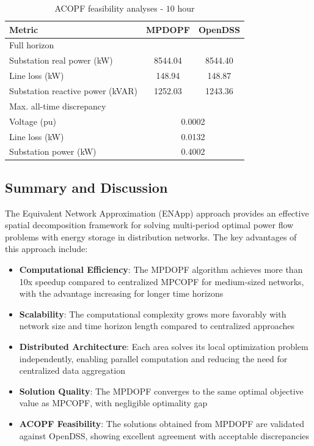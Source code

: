 \begin{table}[t]
    \centering
    \caption{ACOPF feasibility analyses - $10$ hour}
    \begin{tabular}{|l|c|c|}
    \hline
    \textbf{Metric} & \textbf{MPDOPF} & \textbf{OpenDSS} \\ \hline
    Full horizon  & \multicolumn{2}{c|}{} \\ \hline
    \quad Substation real power (kW) & 8544.04 & 8544.40 \\ \hline
    \quad Line loss (kW) & 148.94 & 148.87 \\ \hline
    \quad Substation reactive power (kVAR) & 1252.03 & 1243.36 \\ \hline
    Max. all-time discrepancy & \multicolumn{2}{c|}{} \\ \hline
    \quad Voltage (pu) & \multicolumn{2}{c|}{0.0002} \\ \hline
    \quad Line loss (kW) & \multicolumn{2}{c|}{0.0132} \\ \hline
    \quad Substation power (kW) & \multicolumn{2}{c|}{0.4002} \\ \hline
    \end{tabular}
    \label{table:feas-copf-10-20-30_enapp}
    \vspace{-3mm}
\end{table}

\subsection{Summary and Discussion}

The Equivalent Network Approximation (ENApp) approach provides an effective spatial decomposition framework for solving multi-period optimal power flow problems with energy storage in distribution networks. The key advantages of this approach include:

\begin{itemize}
    \item \textbf{Computational Efficiency}: The MPDOPF algorithm achieves more than 10x speedup compared to centralized MPCOPF for medium-sized networks, with the advantage increasing for longer time horizons
    \item \textbf{Scalability}: The computational complexity grows more favorably with network size and time horizon length compared to centralized approaches
    \item \textbf{Distributed Architecture}: Each area solves its local optimization problem independently, enabling parallel computation and reducing the need for centralized data aggregation
    \item \textbf{Solution Quality}: The MPDOPF converges to the same optimal objective value as MPCOPF, with negligible optimality gap
    \item \textbf{ACOPF Feasibility}: The solutions obtained from MPDOPF are validated against OpenDSS, showing excellent agreement with acceptable discrepancies
\end{itemize}

